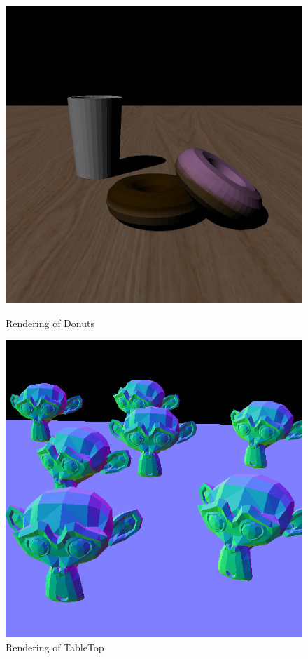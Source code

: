 \documentclass[a4paper]{article}
\begin{document}
\begin{figure}[htb]
  \begin{minipage}[t]{.4\textwidth}
      \centering
      \includegraphics[width=\textwidth]{q2/Donuts/scene.png}
      \caption{Rendering of Donuts}
  \end{minipage}
  \hfill
  \begin{minipage}[t]{.4\textwidth}
      \centering
      \includegraphics[width=\textwidth]{q2/TableTop/scene.png}
      \caption{Rendering of TableTop}
  \end{minipage}
\end{figure}
\end{document}
